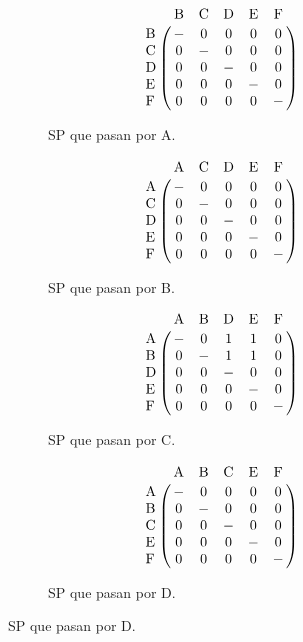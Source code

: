 \begin{figure}[htpb]
  \centering
  \begin{subfigure}[b]{.3\textwidth}
    \begin{equation*}
      \bordermatrix{
       ~  & $B$ & $C$ & $D$ & $E$ & $F$ \cr
      $B$ &  -  &  0  &  0  &  0  &  0  \cr
      $C$ &  0  &  -  &  0  &  0  &  0  \cr
      $D$ &  0  &  0  &  -  &  0  &  0  \cr
      $E$ &  0  &  0  &  0  &  -  &  0  \cr
      $F$ &  0  &  0  &  0  &  0  &  -  \cr
    }
    \end{equation*}
    \caption{SP que pasan por A.}
    \label{fig:sppn:a}
  \end{subfigure}
  \hspace{3mm}
  \begin{subfigure}[b]{.3\textwidth}
    \begin{equation*}
      \bordermatrix{
       ~  & $A$ & $C$ & $D$ & $E$ & $F$ \cr
      $A$ &  -  &  0  &  0  &  0  &  0  \cr
      $C$ &  0  &  -  &  0  &  0  &  0  \cr
      $D$ &  0  &  0  &  -  &  0  &  0  \cr
      $E$ &  0  &  0  &  0  &  -  &  0  \cr
      $F$ &  0  &  0  &  0  &  0  &  -  \cr
    }
    \end{equation*}
    \caption{SP que pasan por B.}
    \label{fig:sppn:b}
  \end{subfigure}
  \hspace{3mm}
  \begin{subfigure}[b]{.3\textwidth}
    \begin{equation*}
      \bordermatrix{
       ~  & $A$ & $B$ & $D$ & $E$ & $F$ \cr
      $A$ &  -  &  0  &  1  &  1  &  0  \cr
      $B$ &  0  &  -  &  1  &  1  &  0  \cr
      $D$ &  0  &  0  &  -  &  0  &  0  \cr
      $E$ &  0  &  0  &  0  &  -  &  0  \cr
      $F$ &  0  &  0  &  0  &  0  &  -  \cr
    }
    \end{equation*}
    \caption{SP que pasan por C.}
    \label{fig:sppn:c}
  \end{subfigure}
  \hspace{3mm}
  \begin{subfigure}[b]{.3\textwidth}
    \begin{equation*}
      \bordermatrix{
       ~  & $A$ & $B$ & $C$ & $E$ & $F$ \cr
      $A$ &  -  &  0  &  0  &  0  &  0  \cr
      $B$ &  0  &  -  &  0  &  0  &  0  \cr
      $C$ &  0  &  0  &  -  &  0  &  0  \cr
      $E$ &  0  &  0  &  0  &  -  &  0  \cr
      $F$ &  0  &  0  &  0  &  0  &  -  \cr
    }
    \end{equation*}
    \caption{SP que pasan por D.}
    \label{fig:sppn:d}

\end{subfigure}
\end{figure}
